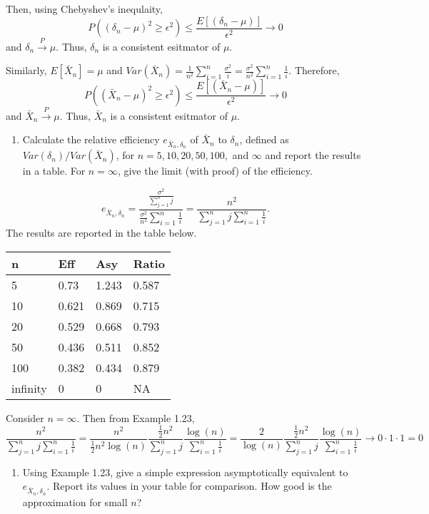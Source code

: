 \documentclass[12pt,]{article}
\providecommand{\tightlist}{%
  \setlength{\itemsep}{0pt}\setlength{\parskip}{0pt}}
\begin{document}
Then, using Chebyshev's inequlaity,
\[P\left((\delta_n-\mu)^2\ge \epsilon^2\right)\le \frac{E\left[(\delta_n-\mu)\right]}{\epsilon^2}\rightarrow 0\]
and \(\delta_n\overset{P}\rightarrow \mu.\) Thus, \(\delta_n\) is a
consistent esitmator of \(\mu.\)

Similarly, \(E[\bar X_n]=\mu\) and
\(Var(\bar X_n)=\frac{1}{n^2}\sum_{i=1}^n\frac{\sigma^2}{i}=\frac{\sigma^2}{n^2}\sum_{i=1}^n\frac{1}{i}.\)
Therefore,
\[P\left((\bar X_n-\mu)^2\ge \epsilon^2\right)\le \frac{E\left[(\bar X_n-\mu)\right]}{\epsilon^2}\rightarrow 0\]
and \(\bar X_n\overset{P}\rightarrow \mu.\) Thus, \(\bar X_n\) is a
consistent esitmator of \(\mu.\)

\begin{enumerate}
\def\labelenumi{(\alph{enumi})}
\setcounter{enumi}{1}
\tightlist
\item
  Calculate the relative efficiency \(e_{\bar{X}_n,\delta_n}\) of
  \(\bar{X}_n\) to \(\delta_n\), defined as
  \(Var(\delta_n)/Var(\bar{X}_n)\), for \(n = 5,10, 20, 50, 100,\) and
  \(\infty\) and report the results in a table. For \(n = \infty\), give
  the limit (with proof) of the efficiency.
\end{enumerate}

\[e_{\bar{X}_n,\delta_n}=\frac{\frac{\sigma^2}{\sum_{j=1}^nj}}{\frac{\sigma^2}{n^2}\sum_{i=1}^n\frac{1}{i}}=\frac{n^2}{\sum_{j=1}^nj \sum_{i=1}^n\frac{1}{i}}.\]
The results are reported in the table below.

\begin{longtable}[]{@{}llll@{}}
\toprule
n & Eff & Asy & Ratio\tabularnewline
\midrule
\endhead
5 & 0.73 & 1.243 & 0.587\tabularnewline
10 & 0.621 & 0.869 & 0.715\tabularnewline
20 & 0.529 & 0.668 & 0.793\tabularnewline
50 & 0.436 & 0.511 & 0.852\tabularnewline
100 & 0.382 & 0.434 & 0.879\tabularnewline
infinity & 0 & 0 & NA\tabularnewline
\bottomrule
\end{longtable}

Consider \(n = \infty.\) Then from Example 1.23,
\[\frac{n^2}{\sum_{j=1}^nj \sum_{i=1}^n\frac{1}{i}}=\frac{n^2}{\frac{1}{2}n^2\log(n)} \frac{\frac{1}{2}n^2}{\sum_{j=1}^nj}\frac{\log(n)}{\sum_{i=1}^n\frac{1}{i}}=\frac{2}{\log(n)} \frac{\frac{1}{2}n^2}{\sum_{j=1}^nj}\frac{\log(n)}{\sum_{i=1}^n\frac{1}{i}}\rightarrow 0\cdot 1 \cdot 1 = 0\]

\begin{enumerate}
\def\labelenumi{(\alph{enumi})}
\setcounter{enumi}{2}
\tightlist
\item
  Using Example 1.23, give a simple expression asymptotically equivalent
  to \(e_{\bar{X}_n,\delta_n}\). Report its values in your table for
  comparison. How good is the approximation for small \(n\)?
\end{enumerate}
\end{document}
